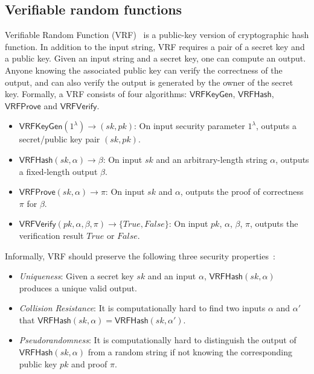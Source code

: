 \subsection{Verifiable random functions}

Verifiable Random Function (VRF)~\cite{micali1999verifiable} is a public-key version of cryptographic hash function.
In addition to the input string, VRF requires a pair of a secret key and a public key.
Given an input string and a secret key, one can compute an output.
Anyone knowing the associated public key can verify the correctness of the output, and can also verify the output is generated by the owner of the secret key.
Formally, a VRF consists of four algorithms: $\mathsf{VRFKeyGen}$, $\mathsf{VRFHash}$, $\mathsf{VRFProve}$ and $\mathsf{VRFVerify}$.

\begin{itemize}
    \item $\mathsf{VRFKeyGen}(1^{\lambda}) \to (sk, pk)$: On input security parameter $1^{\lambda}$, outputs a secret/public key pair $(sk, pk)$.
    \item $\mathsf{VRFHash}(sk, \alpha) \to \beta $: On input $sk$ and an arbitrary-length string $\alpha$, outputs a fixed-length output $\beta$.
    \item $\mathsf{VRFProve}(sk, \alpha) \to \pi$: On input $sk$ and $\alpha$, outputs the proof of correctness $\pi$ for $\beta$.
    \item $\mathsf{VRFVerify}(pk, \alpha, \beta, \pi) \to \{True, False\}$: On input $pk$, $\alpha$, $\beta$, $\pi$, outputs the verification result $True$ or $False$.
\end{itemize}

Informally, VRF should preserve the following three security properties~\cite{goldberg2017draft}:

\begin{itemize}
    \item \emph{Uniqueness}: Given a secret key $sk$ and an input $\alpha$, $\mathsf{VRFHash}(sk, \alpha)$ produces a unique valid output.
    \item \emph{Collision Resistance}: It is computationally hard to find two inputs $\alpha$ and $\alpha'$ that $\mathsf{VRFHash}(sk, \alpha) = \mathsf{VRFHash}(sk, \alpha')$.
    \item \emph{Pseudorandomness}: It is computationally hard to distinguish the output of $\mathsf{VRFHash}(sk, \alpha)$ from a random string if not knowing the corresponding public key $pk$ and proof $\pi$.
\end{itemize}

